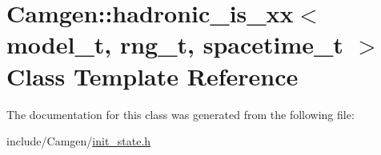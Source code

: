 \hypertarget{a00256}{\section{Camgen\-:\-:hadronic\-\_\-is\-\_\-xx$<$ model\-\_\-t, rng\-\_\-t, spacetime\-\_\-t $>$ Class Template Reference}
\label{a00256}
}


The documentation for this class was generated from the following file\-:\begin{DoxyCompactItemize}
\item 
include/\-Camgen/\hyperlink{a00649}{init\-\_\-state.\-h}\end{DoxyCompactItemize}
